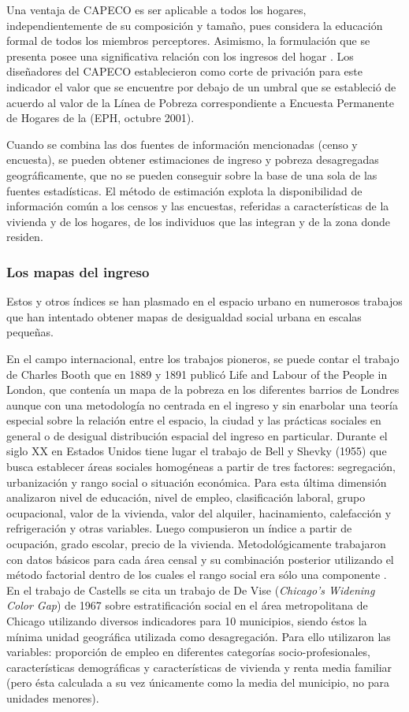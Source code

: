 Una ventaja de CAPECO es ser aplicable a todos los hogares, independientemente de su composición y tamaño, pues considera la educación formal de todos los miembros perceptores. Asimismo, la formulación que se presenta posee una significativa relación con los ingresos del hogar \cite{indec2003a}. Los diseñadores del CAPECO establecieron como corte de privación para este indicador el valor que se encuentre por debajo de un umbral que se estableció de acuerdo al valor de la Línea de Pobreza correspondiente a Encuesta Permanente de Hogares de la (EPH, octubre 2001).

Cuando se combina las dos fuentes de información mencionadas (censo y encuesta), se pueden obtener estimaciones de ingreso y pobreza desagregadas geográficamente, que no se pueden conseguir sobre la base de una sola de las fuentes estadísticas. El método de estimación explota la disponibilidad de información común a los censos y las encuestas, referidas a características de la vivienda y de los hogares, de los individuos que las integran y de la zona donde residen.

\subsubsection{Los mapas del ingreso}

Estos y otros índices se han plasmado en el espacio urbano en numerosos trabajos que han intentado obtener mapas de desigualdad social urbana en escalas pequeñas.

En el campo internacional, entre los trabajos pioneros, se puede contar el trabajo de Charles Booth que en 1889 y 1891 publicó Life and Labour of the People in London, que contenía un mapa de la pobreza en los diferentes barrios de Londres aunque con una metodología no centrada en el ingreso y sin enarbolar una teoría especial sobre la relación entre el espacio, la ciudad y las prácticas sociales en general o de desigual distribución espacial del ingreso en particular. Durante el siglo XX en Estados Unidos tiene lugar el trabajo de Bell y Shevky (1955) que busca establecer áreas sociales homogéneas a partir de tres factores: segregación, urbanización y rango social o situación económica. Para esta última dimensión analizaron nivel de educación, nivel de empleo, clasificación laboral, grupo ocupacional, valor de la vivienda, valor del alquiler, hacinamiento, calefacción y refrigeración y otras variables. Luego compusieron un índice a partir de ocupación, grado escolar, precio de la vivienda. Metodológicamente trabajaron con datos básicos para cada área censal y su combinación posterior utilizando el método factorial dentro de los cuales el rango social era sólo una componente \cite{buzai2014,betin}.  En el trabajo de Castells se cita un trabajo de De Vise (\textit{Chicago's Widening Color Gap}) de 1967 sobre estratificación social en el área metropolitana de Chicago utilizando diversos indicadores para 10 municipios, siendo éstos la mínima unidad geográfica utilizada como desagregación. Para ello utilizaron las variables: proporción de empleo en diferentes categorías socio-profesionales, características demográficas y características de vivienda y renta media familiar (pero ésta calculada a su vez únicamente como la media del municipio, no para unidades menores).

